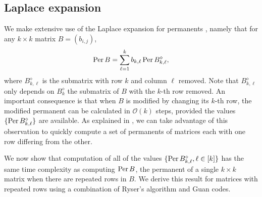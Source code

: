 \documentclass[a4paper,11pt]{article}
\newcommand{\perm}{\mathop{\textup{Per}}}
\newcommand{\bigo}[1]{\mathcal{O}(#1)}
\newcommand{\Bkl}{B^{\diamond}_{k,\ell}}
\newcommand{\Bk}{B^{\diamond}_{k}}
\begin{document}
\subsection{Laplace expansion}\label{sec:Laplace}
We make extensive use of the Laplace expansion for permanents \citep[see][page 578]{marcus1965permanents}, namely that for any $k \times k$ matrix $B = (b_{i,j})$,
\begin{equation}\label{eq:Laplace}
\perm B = \sum_{\ell = 1}^k b_{k,\ell} \perm \Bkl, \nonumber
\end{equation}
where $\Bkl$ is the submatrix with row $k$ and column $\ell$ removed.  Note that $\Bkl$ only depends on $\Bk$ the submatrix of $B$ with the $k$-th row removed.  An important consequence is that when $B$ is modified by changing its  $k$-th row, the modified permanent can be calculated in $\bigo{k}$ steps,  provided the values $\{\perm \Bkl\}$ are available. As explained in \citet{clifford2018classical}, we can take advantage of this observation to quickly compute a set of permanents of matrices each with one row differing from the other.

We now show that computation of all of the values $\{\perm \Bkl, \ell \in [k]\}$ has the same time complexity as computing $\perm B$, the permanent of a single $k \times k$ matrix when there are repeated rows in $B$.   We derive this result for matrices with repeated rows using a combination of Ryser's algorithm and Guan codes.
   
\end{document}
